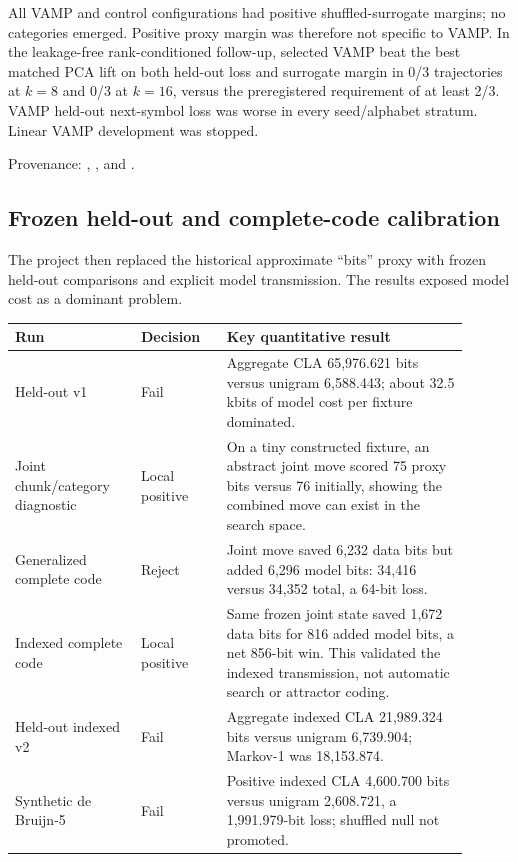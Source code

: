\documentclass[10pt]{article}
\begin{document}
All VAMP and control configurations had positive shuffled-surrogate margins;
no categories emerged. Positive proxy margin was therefore not specific to
VAMP. In the leakage-free rank-conditioned follow-up, selected VAMP beat the
best matched PCA lift on both held-out loss and surrogate margin in 0/3
trajectories at $k=8$ and 0/3 at $k=16$, versus the preregistered requirement
of at least 2/3. VAMP held-out next-symbol loss was worse in every
seed/alphabet stratum. Linear VAMP development was stopped.

Provenance:
,
, and
.

\subsection{Frozen held-out and complete-code calibration}

The project then replaced the historical approximate ``bits'' proxy with
frozen held-out comparisons and explicit model transmission. The results
exposed model cost as a dominant problem.

\begin{longtable}{p{0.25\linewidth}p{0.17\linewidth}p{0.48\linewidth}}
\toprule
Run & Decision & Key quantitative result \\
\midrule
\endhead
Held-out v1 & Fail & Aggregate CLA 65,976.621 bits versus unigram 6,588.443;
about 32.5 kbits of model cost per fixture dominated. \\
Joint chunk/category diagnostic & Local positive & On a tiny constructed
fixture, an abstract joint move scored 75 proxy bits versus 76 initially,
showing the combined move can exist in the search space. \\
Generalized complete code & Reject & Joint move saved 6,232 data bits but
added 6,296 model bits: 34,416 versus 34,352 total, a 64-bit loss. \\
Indexed complete code & Local positive & Same frozen joint state saved 1,672
data bits for 816 added model bits, a net 856-bit win. This validated the
indexed transmission, not automatic search or attractor coding. \\
Held-out indexed v2 & Fail & Aggregate indexed CLA 21,989.324 bits versus
unigram 6,739.904; Markov-1 was 18,153.874. \\
Synthetic de Bruijn-5 & Fail & Positive indexed CLA 4,600.700 bits versus
unigram 2,608.721, a 1,991.979-bit loss; shuffled null not promoted. \\
\bottomrule
\end{longtable}
\end{document}
